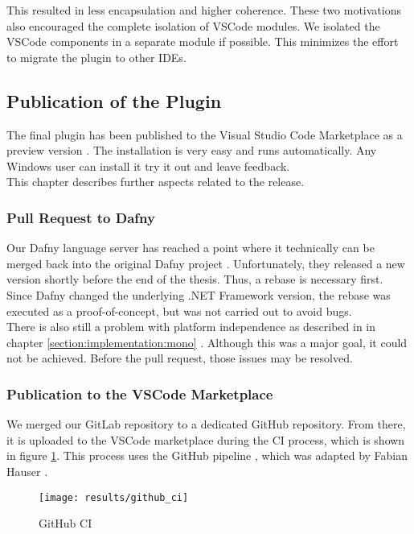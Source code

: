 This resulted in less encapsulation and higher coherence.
These two motivations also encouraged the complete isolation of VSCode modules.
We isolated the VSCode components in a separate module if possible.
This minimizes the effort to migrate the plugin to other IDEs.


\subsection{Publication of the Plugin}
The final plugin has been published to the Visual Studio Code Marketplace as a preview version \cite{our-dafny-plugin}.
The installation is very easy and runs automatically.
Any Windows user can install it \textendash{} try it out and leave feedback.\\

This chapter describes further aspects related to the release.

\subsubsection{Pull Request to Dafny}
Our Dafny language server has reached a point where it technically can be merged back into the original Dafny project \cite{dafny_lang_github}.
Unfortunately, they released a new version shortly before the end of the thesis.
Thus, a rebase is necessary first.
Since Dafny changed the underlying .NET Framework version, the rebase was executed as a proof-of-concept, but was not carried out to avoid bugs.\\

There is also still a problem with platform independence as described in in chapter
\ref{section:implementation:mono} \textendash{} .
Although this was a major goal, it could not be achieved.
Before the pull request, those issues may be resolved.


\subsubsection{Publication to the VSCode Marketplace}
We merged our GitLab repository to a dedicated GitHub repository.
From there, it is uploaded to the VSCode marketplace during the CI process, which is shown in figure \ref{fig:github_ci}.
This process uses the GitHub pipeline , which
was adapted by Fabian Hauser \cite{our-dafny-plugin-github-publish}.

\begin{figure}[H]
    \centering
    \texttt{[image: results/github\_ci]}
    \caption{GitHub CI}
    \label{fig:github_ci}
\end{figure}

